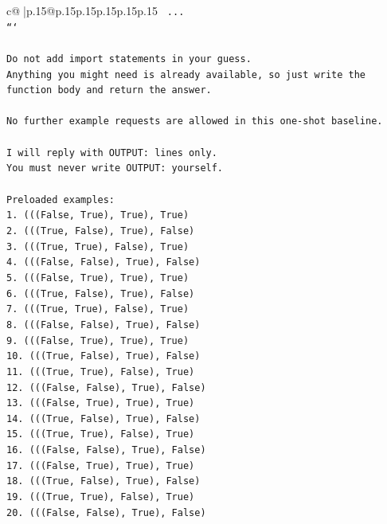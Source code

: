 \documentclass{article}
\begin{document}
{\begin{supertabular}{c@{$\;$}|p{.15\linewidth}@{}p{.15\linewidth}p{.15\linewidth}p{.15\linewidth}p{.15\linewidth}p{.15\linewidth}}
{{{\texttt{    ...} \\
\texttt{```} \\
\\ 
\texttt{Do not add import statements in your guess.} \\
\texttt{Anything you might need is already available, so just write the function body and return the answer.} \\
\\ 
\texttt{No further example requests are allowed in this one{-}shot baseline.} \\
\\ 
\texttt{I will reply with OUTPUT: lines only.} \\
\texttt{You must never write OUTPUT: yourself.} \\
\\ 
\texttt{Preloaded examples:} \\
\texttt{1. (((False, True), True), True)} \\
\texttt{2. (((True, False), True), False)} \\
\texttt{3. (((True, True), False), True)} \\
\texttt{4. (((False, False), True), False)} \\
\texttt{5. (((False, True), True), True)} \\
\texttt{6. (((True, False), True), False)} \\
\texttt{7. (((True, True), False), True)} \\
\texttt{8. (((False, False), True), False)} \\
\texttt{9. (((False, True), True), True)} \\
\texttt{10. (((True, False), True), False)} \\
\texttt{11. (((True, True), False), True)} \\
\texttt{12. (((False, False), True), False)} \\
\texttt{13. (((False, True), True), True)} \\
\texttt{14. (((True, False), True), False)} \\
\texttt{15. (((True, True), False), True)} \\
\texttt{16. (((False, False), True), False)} \\
\texttt{17. (((False, True), True), True)} \\
\texttt{18. (((True, False), True), False)} \\
\texttt{19. (((True, True), False), True)} \\
\texttt{20. (((False, False), True), False)} \\
}}}
\end{supertabular}}
\end{document}

